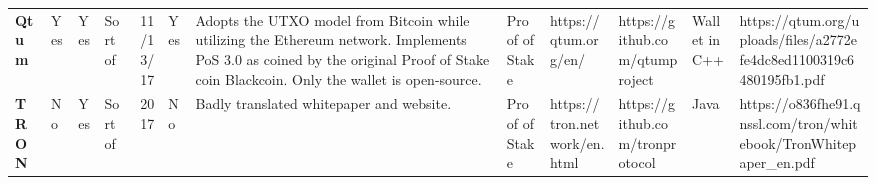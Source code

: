 \begin{table}[ht]
\begin{adjustbox}{width=25cm, height=6cm, angle=270}
\begin{tabular}{llllrlp{17.915em}rlrrr}
      \rowcolor[rgb]{ .267,  .447,  .769} \textcolor[rgb]{ 1,  1,  1}{\textbf{Qtum}} & \cellcolor[rgb]{ .776,  .937,  .808}\textcolor[rgb]{ 0,  .38,  0}{Yes} & \cellcolor[rgb]{ .776,  .937,  .808}\textcolor[rgb]{ 0,  .38,  0}{Yes} & \cellcolor[rgb]{ 1,  .922,  .612}\textcolor[rgb]{ .612,  .341,  0}{Sort of} & \cellcolor[rgb]{ 1,  1,  1}11/13/17 & \cellcolor[rgb]{ .776,  .937,  .808}\textcolor[rgb]{ 0,  .38,  0}{Yes} & \cellcolor[rgb]{ .851,  .882,  .949}\textcolor[rgb]{ .188,  .329,  .588}{Adopts the UTXO model from Bitcoin while utilizing the Ethereum network. Implements PoS 3.0 as coined by the original Proof of Stake coin Blackcoin. Only the wallet is open-source.} & \multicolumn{1}{l}{\cellcolor[rgb]{ .851,  .882,  .949}\textcolor[rgb]{ .188,  .329,  .588}{Proof of Stake}} & \cellcolor[rgb]{ 1,  1,  1}https://qtum.org/en/ & \multicolumn{1}{l}{\cellcolor[rgb]{ 1,  1,  1}https://github.com/qtumproject} & \multicolumn{1}{l}{\cellcolor[rgb]{ .851,  .882,  .949}\textcolor[rgb]{ .188,  .329,  .588}{Wallet in C++}} & \multicolumn{1}{l}{\cellcolor[rgb]{ 1,  1,  1}https://qtum.org/uploads/files/a2772efe4dc8ed1100319c6480195fb1.pdf} \\
      \rowcolor[rgb]{ .267,  .447,  .769} \textcolor[rgb]{ 1,  1,  1}{\textbf{TRON}} & \cellcolor[rgb]{ 1,  .78,  .808}\textcolor[rgb]{ .612,  0,  .024}{No} & \cellcolor[rgb]{ .776,  .937,  .808}\textcolor[rgb]{ 0,  .38,  0}{Yes} & \cellcolor[rgb]{ 1,  .922,  .612}\textcolor[rgb]{ .612,  .341,  0}{Sort of} & \cellcolor[rgb]{ .851,  .882,  .949}\textcolor[rgb]{ .188,  .329,  .588}{2017} & \cellcolor[rgb]{ 1,  .78,  .808}\textcolor[rgb]{ .612,  0,  .024}{No} & \cellcolor[rgb]{ 1,  1,  1}\textcolor[rgb]{ .188,  .329,  .588}{Badly translated whitepaper and website.} & \multicolumn{1}{l}{\cellcolor[rgb]{ .851,  .882,  .949}\textcolor[rgb]{ .188,  .329,  .588}{Proof of Stake}} & \cellcolor[rgb]{ .851,  .882,  .949}\textcolor[rgb]{ .188,  .329,  .588}{https://tron.network/en.html} & \multicolumn{1}{l}{\cellcolor[rgb]{ .851,  .882,  .949}\textcolor[rgb]{ .188,  .329,  .588}{https://github.com/tronprotocol}} & \multicolumn{1}{l}{\cellcolor[rgb]{ .851,  .882,  .949}\textcolor[rgb]{ .188,  .329,  .588}{Java}} & \multicolumn{1}{l}{\cellcolor[rgb]{ .851,  .882,  .949}\textcolor[rgb]{ .188,  .329,  .588}{https://o836fhe91.qnssl.com/tron/whitebook/TronWhitepaper\_en.pdf}} \\

\end{tabular}
\end{adjustbox}
\end{table}
